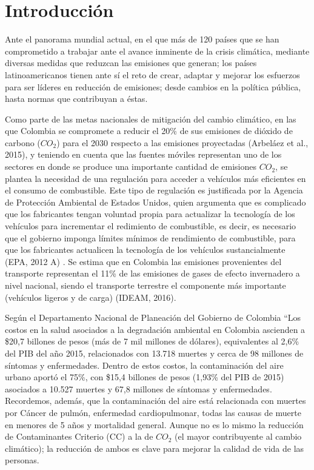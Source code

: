 \chapter{Introducción}

Ante el panorama mundial actual, en el que más de 120 países que se han comprometido a trabajar ante el avance inminente de la crisis climática, mediante diversas medidas que reduzcan las emisiones que generan; los países latinoamericanos tienen ante sí el reto de crear, adaptar y mejorar los esfuerzos para ser líderes en reducción de emisiones; desde cambios en la política pública, hasta normas que contribuyan a éstas.  \label{Estrategia de Argumentación}

Como parte de las metas nacionales de mitigación del cambio climático, en las que Colombia se compromete a reducir el 20\% de sus emisiones de dióxido de carbono ($CO_2$) para el 2030 respecto a las emisiones proyectadas (Arbeláez et al., 2015), y teniendo en cuenta que las fuentes móviles representan uno de los sectores en donde se produce una importante cantidad de emisiones $CO_2$, se plantea la necesidad de una regulación para acceder a vehículos más eficientes en el consumo de combustible. Este tipo de regulación es justificada por la Agencia de Protección Ambiental de Estados Unidos, quien argumenta que es complicado que los fabricantes tengan voluntad propia para actualizar la tecnología de los vehículos para incrementar el redimiento de combustible, es decir, es necesario que el gobierno imponga límites mínimos de rendimiento de combustible, para que los fabricantes actualicen la tecnología de los vehículos sustancialmente (EPA, 2012 A) \cite{EPA_2012-A}.
Se estima que en Colombia las emisiones provenientes del transporte representan el 11\% de las emisiones de gases de efecto invernadero a nivel nacional, siendo el transporte terrestre el componente más importante (vehículos ligeros y de carga) (IDEAM, 2016). \label{Informe Final}

Según el Departamento Nacional de Planeación del Gobierno de Colombia “Los costos en la salud asociados a la degradación ambiental en Colombia ascienden a \$20,7 billones de pesos (más de 7 mil millones de dólares), equivalentes al 2,6\% del PIB del año 2015, relacionados con 13.718 muertes y cerca de 98 millones de síntomas y enfermedades. Dentro de estos costos, la contaminación del aire urbano aportó el 75\%, con \$15,4 billones de pesos (1,93\% del PIB de 2015) asociados a 10.527 muertes y 67,8 millones de síntomas y enfermedades. Recordemos, además, que la contaminación del aire está relacionada con muertes por Cáncer de pulmón, enfermedad cardiopulmonar, todas las causas de muerte en menores de 5 años y mortalidad general. Aunque no es lo mismo la reducción de Contaminantes Criterio (CC) a la de $CO_2$ (el mayor contribuyente al cambio climático); la reducción de ambos es clave para mejorar la calidad de vida de las personas.  \label{Estrategia de Argumentación}

